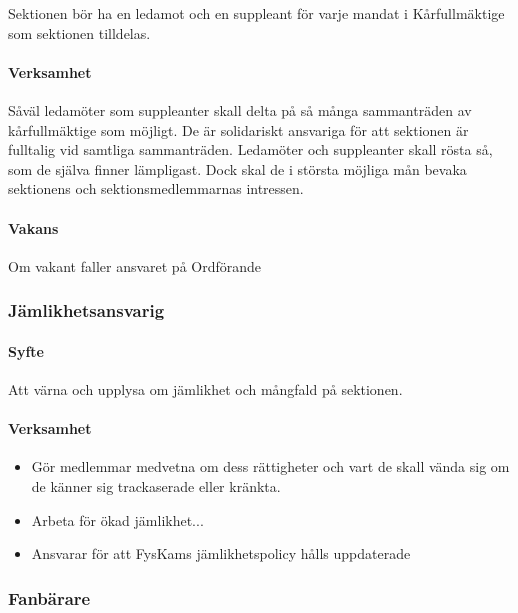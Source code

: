 \documentclass{../resources/dgovdoc}
\begin{document}
Sektionen bör ha en ledamot och en suppleant för varje mandat i Kårfullmäktige som sektionen tilldelas.

\paragraph{Verksamhet}

Såväl ledamöter som suppleanter skall delta på så många sammanträden av kårfullmäktige som möjligt.
De är solidariskt ansvariga för att sektionen är fulltalig vid samtliga sammanträden. 
Ledamöter och suppleanter skall rösta så, som de själva finner lämpligast. Dock skal de i största möjliga mån
bevaka sektionens och sektionsmedlemmarnas intressen. 

\paragraph{Vakans}

Om vakant faller ansvaret på Ordförande

\subsubsection{Jämlikhetsansvarig}

\paragraph{Syfte}

Att värna och upplysa om jämlikhet och mångfald på sektionen.

\paragraph{Verksamhet}

\begin{itemize}

\item Gör medlemmar medvetna om dess rättigheter och vart de skall vända sig om de känner sig trackaserade eller kränkta.
\item Arbeta för ökad jämlikhet...
\item Ansvarar för att FysKams jämlikhetspolicy hålls uppdaterade

\end{itemize}

\subsubsection{Fanbärare}
\end{document}
